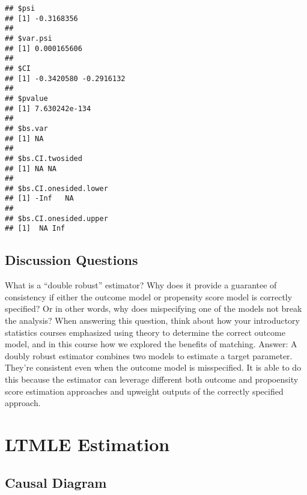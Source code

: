 \documentclass[
]{article}
\begin{document}
\begin{verbatim}
## $psi
## [1] -0.3168356
## 
## $var.psi
## [1] 0.000165606
## 
## $CI
## [1] -0.3420580 -0.2916132
## 
## $pvalue
## [1] 7.630242e-134
## 
## $bs.var
## [1] NA
## 
## $bs.CI.twosided
## [1] NA NA
## 
## $bs.CI.onesided.lower
## [1] -Inf   NA
## 
## $bs.CI.onesided.upper
## [1]  NA Inf
\end{verbatim}

\subsection{Discussion Questions}\label{discussion-questions-1}

What is a ``double robust'' estimator? Why does it provide a guarantee
of consistency if either the outcome model or propensity score model is
correctly specified? Or in other words, why does mispecifying one of the
models not break the analysis? When answering this question, think about
how your introductory statistics courses emphasized using theory to
determine the correct outcome model, and in this course how we explored
the benefits of matching. Answer: A doubly robust estimator combines two
models to estimate a target parameter. They're consistent even when the
outcome model is misspecified. It is able to do this because the
estimator can leverage different both outcome and propoensity score
estimation approaches and upweight outputs of the correctly specified
approach.

\section{LTMLE Estimation}\label{ltmle-estimation}

\subsection{Causal Diagram}\label{causal-diagram-1}
\end{document}
